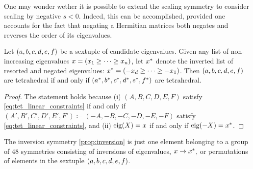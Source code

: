 \documentclass[notitlepage, 10pt]{article}
\begin{document}
One may wonder wether it is possible to extend the scaling symmetry to consider scaling by negative $s < 0$.
Indeed, this can be accomplished, provided one accounts for the fact that negating a Hermitian matrices both negates and reverses the order of its eigenvalues.
\begin{prop}
    \label{prop:inversion}
    Let $(a, b, c, d, e, f)$ be a sextuple of candidate eigenvalues.
    Given any list of non-increasing eigenvalues $x = (x_1 \geq \cdots \geq x_n)$, let $x^{*}$ denote the inverted list of resorted and negated eigenvalues: $x^{*} = (-x_d \geq \cdots \geq - x_1)$.
    Then $(a, b, c, d, e, f)$ are tetrahedral if and only if $(a^{*}, b^{*}, c^{*}, d^{*}, e^{*}, f^{*})$ are tetrahedral.
\end{prop}
\begin{proof}
    The statement holds because (i) $(A,B,C,D,E,F)$ satisfy \cref{eq:tet_linear_constraints} if and only if $(A',B',C',D',E',F') \coloneqq (-A,-B,-C,-D,-E,-F)$ satisfy \cref{eq:tet_linear_constraints}, and (ii) $\operatorname{eig}(X) = x$ if and only if $\operatorname{eig}(-X) = x^{*}$.
\end{proof}

The inversion symmetry \cref{prop:inversion} is just one element belonging to a group of $48$ symmetries consisting of inversions of eigenvalues, $x \rightarrow x^{*}$, or permutations of elements in the sextuple $(a,b,c,d,e,f)$.
\end{document}
